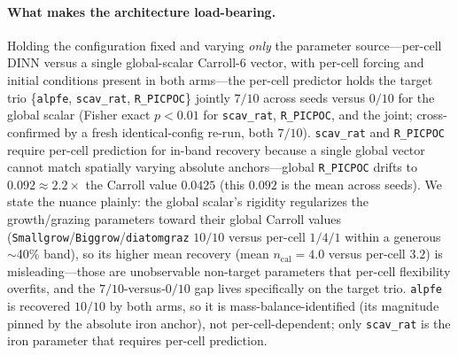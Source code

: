 \documentclass[11pt]{article}
\begin{document}
\paragraph{What makes the architecture load-bearing.}
Holding the configuration fixed and varying \emph{only} the parameter
source---per-cell DINN versus a single global-scalar Carroll-6 vector, with
per-cell forcing and initial conditions present in both arms---the per-cell
predictor holds the target trio \{\texttt{alpfe}, \texttt{scav\_rat},
\texttt{R\_PICPOC}\} jointly $7/10$ across seeds versus $0/10$ for the global
scalar (Fisher exact $p<0.01$ for \texttt{scav\_rat}, \texttt{R\_PICPOC}, and the
joint; cross-confirmed by a fresh identical-config re-run, both $7/10$).
\texttt{scav\_rat} and \texttt{R\_PICPOC} require per-cell prediction for in-band
recovery because a single global vector cannot match spatially varying absolute
anchors---global \texttt{R\_PICPOC} drifts to $0.092\approx2.2\times$ the Carroll
value $0.0425$ (this $0.092$ is the mean across seeds). We
state the nuance plainly: the global scalar's rigidity regularizes the
growth/grazing parameters toward their global Carroll values
(\texttt{Smallgrow}/\texttt{Biggrow}/\texttt{diatomgraz} $10/10$ versus per-cell
$1/4/1$ within a generous $\sim$40\% band), so its higher mean recovery
(mean $n_{\mathrm{cal}}=4.0$ versus per-cell $3.2$) is misleading---those
are unobservable non-target parameters that per-cell flexibility overfits, and the
$7/10$-versus-$0/10$ gap lives specifically on the target trio.
\texttt{alpfe} is recovered $10/10$ by both arms, so it is mass-balance-identified
(its magnitude pinned by the absolute iron anchor), not per-cell-dependent; only
\texttt{scav\_rat} is the iron parameter that requires per-cell prediction.
\end{document}

